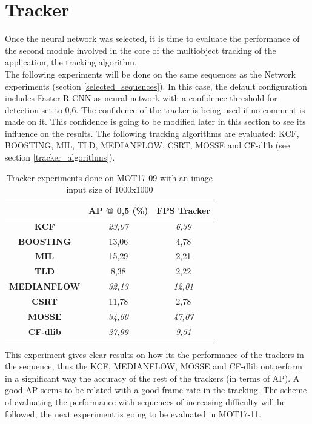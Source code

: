 \section{Tracker}
Once the neural network was selected, it is time to evaluate the performance of the second module involved in the core of the multiobject tracking of the application, the tracking algorithm.\\
The following experiments will be done on the same sequences as the Network experiments (section \ref{selected_sequences}). In this case, the default configuration includes Faster R-CNN as neural network with a confidence threshold for detection set to 0,6. The confidence of the tracker is being used if no comment is made on it. This confidence is going to be modified later in this section to see its influence on the results. The following tracking algorithms are evaluated: KCF, BOOSTING, MIL, TLD, MEDIANFLOW, CSRT, MOSSE and CF-dlib (see section \ref{tracker_algorithms}).\\
\begin{table}[H]
\scriptsize
\begin{center}
\begin{tabular}{|c|c|c|}
\hline
\textbf{}           & \textbf{AP @ 0,5 (\%)} & \textbf{FPS Tracker} \\ \hline
\textbf{KCF}        & \textit{23,07}         & \textit{6,39}        \\ \hline
\textbf{BOOSTING}   & 13,06                  & 4,78                 \\ \hline
\textbf{MIL}        & 15,29                  & 2,21                 \\ \hline
\textbf{TLD}        & 8,38                   & 2,22                 \\ \hline
\textbf{MEDIANFLOW} & \textit{32,13}         & \textit{12,01}       \\ \hline
\textbf{CSRT}       & 11,78                  & 2,78                 \\ \hline
\textbf{MOSSE}      & \textit{34,60}         & \textit{47,07}       \\ \hline
\textbf{CF-dlib}    & \textit{27,99}         & \textit{9,51}        \\ \hline
\end{tabular}
\end{center}
\caption{Tracker experiments done on MOT17-09 with an image input size of 1000x1000}
\label{tab:tracker_exp_1}
\end{table}
This experiment gives clear results on how its the performance of the trackers in the sequence, thus the KCF, MEDIANFLOW, MOSSE and CF-dlib outperform in a significant way the accuracy of the rest of the trackers (in terms of AP). A good AP seems to be related with a good frame rate in the tracking.
The scheme of evaluating the performance with sequences of increasing difficulty will be followed, the next experiment is going to be evaluated in MOT17-11.

